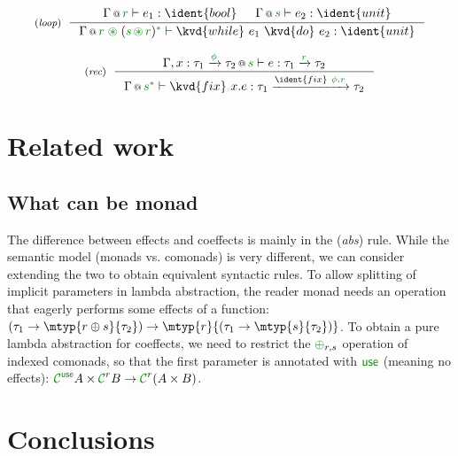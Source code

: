 \begin{equation*}
\tyrule{loop}
  { \coctx{\Gamma}{\cclrd{r}} \vdash e_1 : \ident{bool} &
    \coctx{\Gamma}{\cclrd{s}} \vdash e_2 : \ident{unit} }
  { \coctx{\Gamma}{\cclrd{r} \;\cseq\; (\cclrd{s} \,\cseq\, \cclrd{r})^{\cclrd{*}} } \vdash \kvd{while}~e_1~\kvd{do}~e_2 : \ident{unit} }
\end{equation*}

\begin{equation*}
\tyrule{rec}
  { \coctx{\Gamma, x:\tau_1 \xrightarrow{\cclrd{\phi}} \tau_2}{\cclrd{s}} \vdash e : \tau_1 \xrightarrow{\cclrd{r}} \tau_2 }
  { \coctx{\Gamma}{\cclrd{s^{\ast}}} \vdash \kvd{fix}~x. e : \tau_1 \xrightarrow{\ident{fix}~\cclrd{\phi}.\cclrd{r}} \tau_2 }
\end{equation*}


\section{Related work}

\subsection{What can be monad}
\label{sec:flat-related-monads}

The difference between effects and coeffects is mainly in the (\emph{abs}) rule. While the 
semantic model (monads vs. comonads) is very different, we can consider extending the two to 
obtain equivalent syntactic rules. To allow splitting of implicit parameters in lambda abstraction, 
the reader monad needs an operation that eagerly performs some effects of a function: 
$(\tau_1 \rightarrow \mtyp{r \oplus s}{\tau_2}) \rightarrow \mtyp{r}{(\tau_1 \rightarrow \mtyp{s}{\tau_2})}$.
To obtain a pure lambda abstraction
for coeffects, we need to restrict the $\cpar_{r, s}$ 
operation of indexed comonads, so that the first parameter is annotated with $\cunit$ (meaning
no effects): $\C^{\cunit} A \times \C^r B \rightarrow \C^{r}(A \times B)$.


\section{Conclusions}

